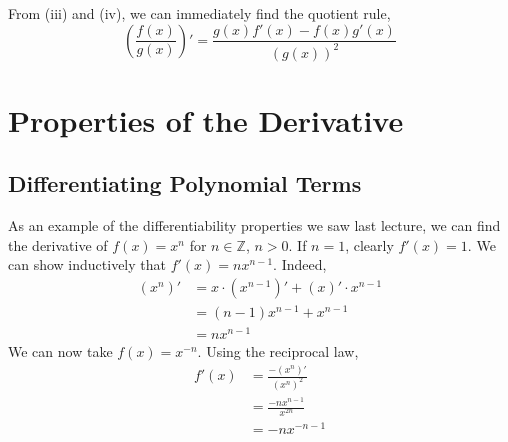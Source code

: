 \documentclass{article}
\begin{document}
\begin{remark}
	From (iii) and (iv), we can immediately find the quotient rule,
	\[ \left( \frac{f(x)}{g(x)} \right)' = \frac{g(x)f'(x) - f(x)g'(x)}{(g(x))^2} \]
\end{remark}

\section{Properties of the Derivative}
\subsection{Differentiating Polynomial Terms}
As an example of the differentiability properties we saw last lecture, we can find the derivative of $f(x) = x^n$ for $n \in \mathbb Z$, $n > 0$. If $n=1$, clearly $f'(x) = 1$. We can show inductively that $f'(x) = nx^{n-1}$. Indeed,
\begin{align*}
	(x^n)' & = x \cdot (x^{n-1})' + (x)' \cdot x^{n-1} \\
	       & = (n-1)x^{n-1} + x^{n-1}                  \\
	       & = nx^{n-1}
\end{align*}
We can now take $f(x) = x^{-n}$. Using the reciprocal law,
\begin{align*}
	f'(x) & = \frac{-(x^n)'}{(x^n)^2}  \\
	      & = \frac{-nx^{n-1}}{x^{2n}} \\
	      & = -nx^{-n-1}
\end{align*}
\end{document}
